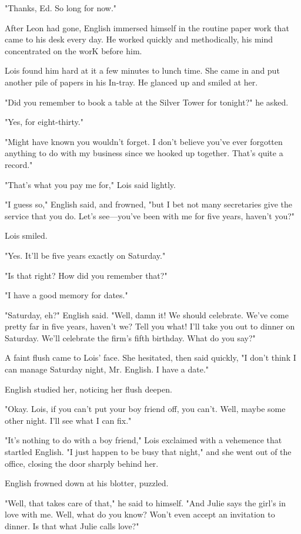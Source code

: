 \documentclass{novel}
\begin{document}
"Thanks, Ed. So long for now."

After Leon had gone, English immersed himself in the routine paper work that came to his desk every day. He worked quickly and methodically, his mind concentrated on the worK before him.

Lois found him hard at it a few minutes to lunch time. She came in and put another pile of papers in his In-tray. He glanced up and smiled at her.

"Did you remember to book a table at the Silver Tower for tonight?" he asked.

"Yes, for eight-thirty."

"Might have known you wouldn't forget. I don't believe you've ever forgotten anything to do with my business since we hooked up together. That's quite a record."

"That's what you pay me for," Lois said lightly.

"I guess so," English said, and frowned, "but I bet not many secretaries give the service that you do. Let's see—you've been with me for five years, haven't you?"

Lois smiled.

"Yes. It'll be five years exactly on Saturday."

"Is that right? How did you remember that?"

"I have a good memory for dates."

"Saturday, eh?" English said. "Well, damn it! We should celebrate. We've come pretty far in five years, haven't we? Tell you what! I'll take you out to dinner on Saturday. We'll celebrate the firm's fifth birthday. What do you say?"

A faint flush came to Lois' face. She hesitated, then said quickly, "I don't think I can manage Saturday night, Mr. English. I have a date."

English studied her, noticing her flush deepen.

"Okay. Lois, if you can't put your boy friend off, you can't. Well, maybe some other night. I'll see what I can fix."

"It's nothing to do with a boy friend," Lois exclaimed with a vehemence that startled English. "I just happen to be busy that night," and she went out of the office, closing the door sharply behind her.

English frowned down at his blotter, puzzled.

"Well, that takes care of that," he said to himself. "And Julie says the girl's in love with me. Well, what do you know? Won't even accept an invitation to dinner. Is that what Julie calls love?"
\end{document}
